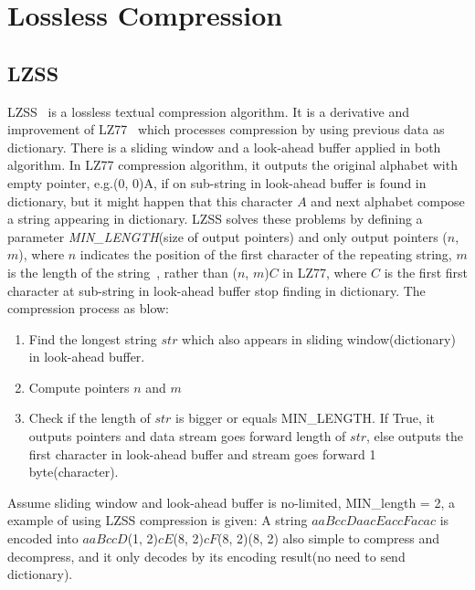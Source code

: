 \section{Lossless Compression}
\subsection{LZSS}
LZSS~\cite{storer1982data} is a lossless textual compression algorithm. It is a
derivative and improvement of LZ77~\cite{ziv1977universal} which processes
compression by using previous data as dictionary. There is a sliding window and
a look-ahead buffer applied in both algorithm. In LZ77 compression algorithm, it
outputs the original alphabet with empty pointer, e.g.(0, 0)A, if on sub-string
in look-ahead buffer is found in dictionary\cite{ziv1977universal}, but it might
happen that this character $A$ and next alphabet compose a string appearing in
dictionary. LZSS solves these problems by defining a parameter
\emph{MIN\_LENGTH}(size of output pointers) and only output pointers ($n$, $m$),
where $n$ indicates the position of the first character of the repeating string,
$m$ is the length of the string~\cite{storer1982data}, rather than ($n$, $m$)$C$
in LZ77, where $C$ is the first first character at sub-string in look-ahead
buffer stop finding in dictionary. The compression process as blow:

\begin{enumerate}
    \item Find the longest string $str$ which also appears in sliding
    window(dictionary) in look-ahead buffer.
    \item Compute pointers $n$ and $m$
    \item Check if the length of $str$ is bigger or equals MIN\_LENGTH. If True,
    it outputs pointers and data stream goes forward length of $str$, else
    outputs the first character in look-ahead buffer and stream goes forward 1
    byte(character).
\end{enumerate}

Assume sliding window and look-ahead buffer is no-limited, MIN\_length = 2, a
example of using LZSS compression is given: A string $aaBccDaacEaccFacac$ is
encoded into $aaBccD$(1, 2)$cE$(8, 2)$cF$(8, 2)(8, 2) also simple to compress
and decompress, and it only decodes by its encoding result(no need to send
dictionary).

